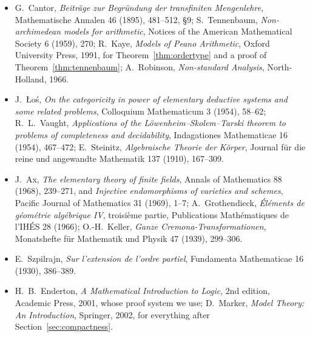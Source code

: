 \begin{itemize}
\item G.~Cantor, \emph{Beiträge zur Begründung der transfiniten Mengenlehre}, Mathematische Annalen 46 (1895), 481--512, \S9; S.~Tennenbaum, \emph{Non-archimedean models for arithmetic}, Notices of the American Mathematical Society 6 (1959), 270; R.~Kaye, \emph{Models of Peano Arithmetic}, Oxford University Press, 1991, for Theorem~\ref{thm:ordertype} and a proof of Theorem~\ref{thm:tennenbaum}; A.~Robinson, \emph{Non-standard Analysis}, North-Holland, 1966.
\item J.~Łoś, \emph{On the categoricity in power of elementary deductive systems and some related problems}, Colloquium Mathematicum 3 (1954), 58--62; R.~L.~Vaught, \emph{Applications of the Löwenheim--Skolem--Tarski theorem to problems of completeness and decidability}, Indagationes Mathematicae 16 (1954), 467--472; E.~Steinitz, \emph{Algebraische Theorie der Körper}, Journal für die reine und angewandte Mathematik 137 (1910), 167--309.
\item J.~Ax, \emph{The elementary theory of finite fields}, Annals of Mathematics 88 (1968), 239--271, and \emph{Injective endomorphisms of varieties and schemes}, Pacific Journal of Mathematics 31 (1969), 1--7; A.~Grothendieck, \emph{Éléments de géométrie algébrique IV}, troisième partie, Publications Mathématiques de l'IHÉS 28 (1966); O.-H.~Keller, \emph{Ganze Cremona-Transformationen}, Monatshefte für Mathematik und Physik 47 (1939), 299--306.
\item E.~Szpilrajn, \emph{Sur l'extension de l'ordre partiel}, Fundamenta Mathematicae 16 (1930), 386--389.
\item H.~B.~Enderton, \emph{A Mathematical Introduction to Logic}, 2nd edition, Academic Press, 2001, whose proof system we use; D.~Marker, \emph{Model Theory: An Introduction}, Springer, 2002, for everything after Section~\ref{sec:compactness}.
\end{itemize}
